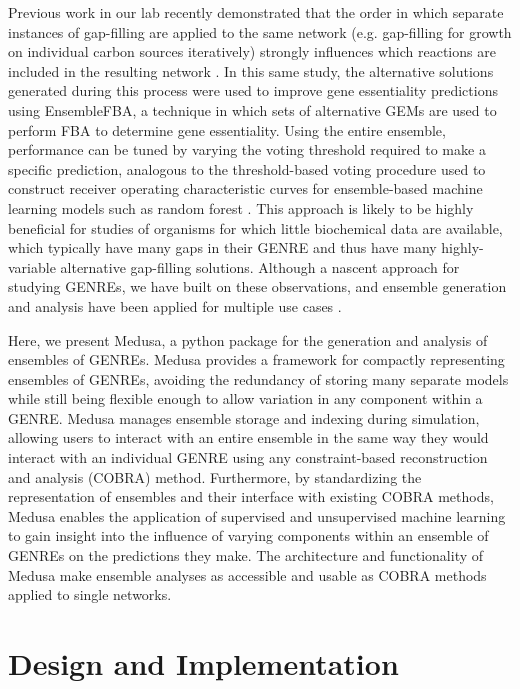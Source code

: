 \documentclass[11pt,twocolumn,notitlepage,openany,twoside]{book}
\begin{document}
\begin{refsection}
Previous work in our lab recently demonstrated that the order in which separate instances of gap-filling are applied to the same network (e.g. gap-filling for growth on individual carbon sources iteratively) strongly influences which reactions are included in the resulting network \cite{Biggs2017-md}. In this same study, the alternative solutions generated during this process were used to improve gene essentiality predictions using EnsembleFBA, a technique in which sets of alternative GEMs are used to perform FBA to determine gene essentiality. Using the entire ensemble, performance can be tuned by varying the voting threshold required to make a specific prediction, analogous to the threshold-based voting procedure used to construct receiver operating characteristic curves for ensemble-based machine learning models such as random forest \cite{Breiman2001-pl}. This approach is likely to be highly beneficial for studies of organisms for which little biochemical data are available, which typically have many gaps in their GENRE and thus have many highly-variable alternative gap-filling solutions. Although a nascent approach for studying GENREs, we have built on these observations, and ensemble generation and analysis have been applied for multiple use cases \cite{Machado2018-cz,Medlock2018-ub,Medlock2018-kx}.

Here, we present Medusa, a python package for the generation and analysis of ensembles of GENREs. Medusa provides a framework for compactly representing ensembles of GENREs, avoiding the redundancy of storing many separate models while still being flexible enough to allow variation in any component within a GENRE. Medusa manages ensemble storage and indexing during simulation, allowing users to interact with an entire ensemble in the same way they would interact with an individual GENRE using any constraint-based reconstruction and analysis (COBRA) method. Furthermore, by standardizing the representation of ensembles and their interface with existing COBRA methods, Medusa enables the application of supervised and unsupervised machine learning to gain insight into the influence of varying components within an ensemble of GENREs on the predictions they make. The architecture and functionality of Medusa make ensemble analyses as accessible and usable as COBRA methods applied to single networks.


\section{Design and Implementation}

\end{refsection}
\end{document}
